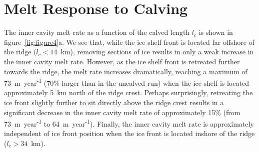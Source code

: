 \documentclass[draft]{agujournal2019}
\begin{document}

\section{Melt Response to Calving}\label{S:Results:lc}
The inner cavity melt rate as a function of the calved length $l_c$ is shown in figure~\ref{fig:figure4}a. We see that, while the ice shelf front is located far offshore of the ridge ($l_c< 14$~km), removing sections of ice results in only a weak increase in the inner cavity melt rate. However, as the ice shelf front is retreated further towards the ridge, the melt rate increases dramatically, reaching a maximum of 73~m~year\textsuperscript{-1} (70\% larger than in the uncalved run) when the ice shelf is located approximately 5~km north of the ridge crest. Perhaps surprisingly, retreating the ice front slightly further to sit directly above the ridge crest results in a significant decrease in the inner cavity melt rate of approximately 15\% (from 73~m~year\textsuperscript{-1} to 64~m~year\textsuperscript{-1}). Finally, the inner cavity melt rate is approximately independent of ice front position when the ice front is located inshore of the ridge ($l_c>34$~km).
\end{document}
